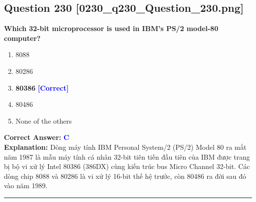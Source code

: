 \documentclass[11pt,a4paper]{article}
\begin{document}
\begin{minipage}{\textwidth}
\subsection*{Question 230 \quad \footnotesize{[0230\_q230\_Question\_230.png]}}
\noindent \textbf{Which 32-bit microprocessor is used in IBM's PS/2 model-80 computer?}

\begin{enumerate}[label=\Alph*.]
    \item 8088
    \item 80286
    \item \textbf{80386} \hfill \textcolor{blue}{\textbf{[Correct]}}
    \item 80486
    \item None of the others
\end{enumerate}

\noindent \textbf{Correct Answer:} \textcolor{blue}{\textbf{C}} \\[2pt]
\noindent \textbf{Explanation:} Dòng máy tính IBM Personal System/2 (PS/2) Model 80 ra mắt năm 1987 là mẫu máy tính cá nhân 32-bit tiên tiến đầu tiên của IBM được trang bị bộ vi xử lý Intel 80386 (386DX) cùng kiến trúc bus Micro Channel 32-bit. Các dòng chip 8088 và 80286 là vi xử lý 16-bit thế hệ trước, còn 80486 ra đời sau đó vào năm 1989.

\par\vspace{0.3cm}
\hrule
\vspace{0.3cm}
\end{minipage}
\end{document}
